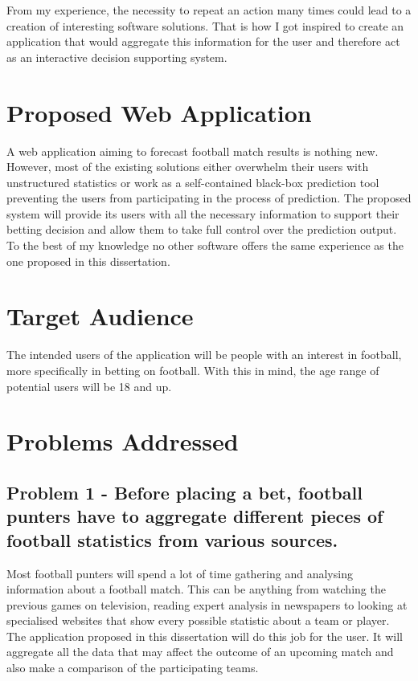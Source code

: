 From my experience, the necessity to repeat an action many times could lead to a creation of interesting software solutions. That is how I got inspired to create an application that would aggregate this information for the user and therefore act as an interactive decision supporting system.

\section{Proposed Web Application}
\label{sec:proposedwebapp_intro}
A web application aiming to forecast football match results is nothing new. However, most of the existing solutions either overwhelm their users with unstructured statistics or work as a self-contained black-box prediction tool preventing the users from participating in the process of prediction. The proposed system will provide its users with all the necessary information to support their betting decision and allow them to take full control over the prediction output. To the best of my knowledge no other software offers the same experience as the one proposed in this dissertation.

\section{Target Audience}
\label{sec:targetaudience_intro}
The intended users of the application will be people with an interest in football, more specifically in betting on football. With this in mind, the age range of potential users will be 18 and up.

\section{Problems Addressed}
\label{sec:problemsaddressed_intro}

\subsection*{Problem 1 - Before placing a bet, football punters have to aggregate different pieces of football statistics from various sources.}
Most football punters will spend a lot of time gathering and analysing information about a football match. This can be anything from watching the previous games on television, reading expert analysis in newspapers to looking at specialised websites that show every possible statistic about a team or player. The application proposed in this dissertation will do this job for the user. It will aggregate all the data that may affect the outcome of an upcoming match and also make a comparison of the participating teams.

